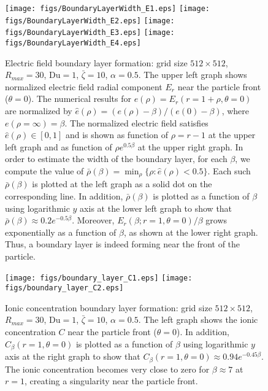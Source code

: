 \documentclass[preprint,10pt]{elsarticle}
\newcommand\Du{\text{Du}}
\begin{document}
\begin{figure}
    \begin{center}
    \texttt{[image: figs/BoundaryLayerWidth\_E1.eps]}
    \texttt{[image: figs/BoundaryLayerWidth\_E2.eps]}
    \texttt{[image: figs/BoundaryLayerWidth\_E3.eps]}
    \texttt{[image: figs/BoundaryLayerWidth\_E4.eps]}
        \caption[Electric field boundary layer]
        {Electric field boundary layer formation: grid size $512 \times 512$, 
        $R_{max} = 30$, $\Du = 1$, $\bar\zeta = 10$, $\alpha = 0.5$. The upper left
        graph shows normalized electric field radial component $E_r$ near the particle front
        ($\theta = 0$). The numerical results for $e(\rho) = E_r(r=1+\rho, \theta=0)$
        are normalized by $\hat{e}(\rho) = \left(e(\rho) - \beta\right)/\left(e(0) - \beta\right)$,
        where $e(\rho = \infty) = \beta$.
        The normalized electric field satisfies $\hat{e}(\rho) \in [0, 1]$ and is shown as function
        of $\rho = r - 1$ at the upper left graph and as function of $\rho e^{0.5 \beta}$ at
        the upper right graph.
        In order to estimate the width of the boundary layer, for each $\beta$, we compute the value 
        of $\bar\rho(\beta) = \min_\rho \{ \rho : \hat{e}(\rho) < 0.5\}$. Each such $\bar\rho(\beta)$
        is plotted at the left graph as a solid dot on the corresponding line.
        In addition, $\bar\rho(\beta)$ is plotted as a function of $\beta$ using logarithmic 
        $y$ axis at the lower left graph to show that $\bar\rho(\beta) \approx 0.2 e^{-0.5 \beta}$.
        Moreover, $E_r(\beta; r=1, \theta=0) / \beta$ grows exponentially as a function of $\beta$,
        as shown at the lower right graph.
        Thus, a boundary layer is indeed forming near the front of the particle.
        }
	    \label{fig:LargeBeta_BoundaryLayer_E}	    
    \end{center}
\end{figure}


\begin{figure}
    \begin{center}
    \texttt{[image: figs/boundary\_layer\_C1.eps]}
    \texttt{[image: figs/boundary\_layer\_C2.eps]}
        \caption[Ionic concentration boundary layer]
        {Ionic concentration boundary layer formation: grid size $512 \times 512$, 
        $R_{max} = 30$, $\Du = 1$, $\bar\zeta = 10$, $\alpha = 0.5$. The left
        graph shows the ionic concentration $C$ near the particle front
        ($\theta = 0$). 
        In addition, $C_\beta(r=1, \theta=0)$ is plotted as a function of $\beta$ using logarithmic 
        $y$ axis at the right graph to show that 
        $C_\beta(r=1, \theta=0) \approx 0.94 e^{-0.45 \beta}$.
        The ionic concentration becomes very close to zero for $\beta \approx 7$ at $r = 1$, 
        creating a singularity near the particle front.
        }
	    \label{fig:LargeBeta_BoundaryLayer_C}	    
    \end{center}
\end{figure}
\end{document}
